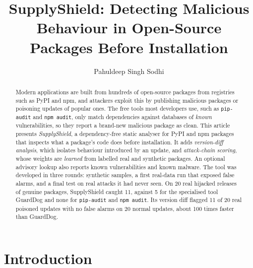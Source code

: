 \documentclass[runningheads]{llncs}
\begin{document}
\title{SupplyShield: Detecting Malicious Behaviour in Open-Source Packages Before Installation}

\author{Pahuldeep Singh Sodhi}

\maketitle

\begin{abstract}
Modern applications are built from hundreds of open-source packages from registries such as PyPI and npm, and attackers exploit this by publishing malicious packages or poisoning updates of popular ones. The free tools most developers use, such as \texttt{pip-audit} and \texttt{npm audit}, only match dependencies against databases of \emph{known} vulnerabilities, so they report a brand-new malicious package as clean. This article presents \emph{SupplyShield}, a dependency-free static analyser for PyPI and npm packages that inspects what a package's code does before installation. It adds \emph{version-diff analysis}, which isolates behaviour introduced by an update, and \emph{attack-chain scoring}, whose weights are \emph{learned} from labelled real and synthetic packages. An optional advisory lookup also reports known vulnerabilities and known malware. The tool was developed in three rounds: synthetic samples, a first real-data run that exposed false alarms, and a final test on real attacks it had never seen. On 20 real hijacked releases of genuine packages, SupplyShield caught 11, against 5 for the specialised tool GuardDog and none for \texttt{pip-audit} and \texttt{npm audit}. Its version diff flagged 11 of 20 real poisoned updates with no false alarms on 20 normal updates, about 100 times faster than GuardDog.

\end{abstract}

\section{Introduction}
\end{document}
